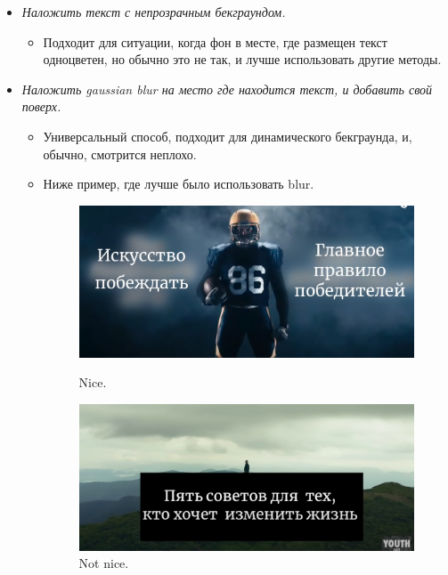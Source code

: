 \documentclass[
a4paper, %
12pt, %
article,
onecolumn, %
openany, %
]{memoir}
\begin{document}
\begin{itemize}
    \item \emph{Наложить текст с непрозрачным бекграундом.}

        \begin{itemize}
            \item Подходит для ситуации, когда фон в месте, где размещен текст
                одноцветен, но обычно это не так, и лучше использовать другие методы.
        \end{itemize}

    \item \emph{Наложить gaussian blur на место где находится текст, и добавить
        свой поверх.}

        \begin{itemize}
            \item Универсальный способ, подходит для
                динамического бекграунда, и, обычно, смотрится неплохо.

            \item Ниже пример, где лучше было использовать blur.

                \begin{figure}[!hbp]
                    \centering
                    \begin{minipage}[b]{0.4\textwidth}
                        \includegraphics[width=\textwidth]{titleBlur}
                        \caption{Nice.}
                    \end{minipage}
                    \hfill
                    \begin{minipage}[b]{0.4\textwidth}
                        \includegraphics[width=\textwidth]{titleBlurBad}
                        \caption{Not nice.}
                    \end{minipage}
                \end{figure}


\end{itemize}
\end{itemize}
\end{document}
